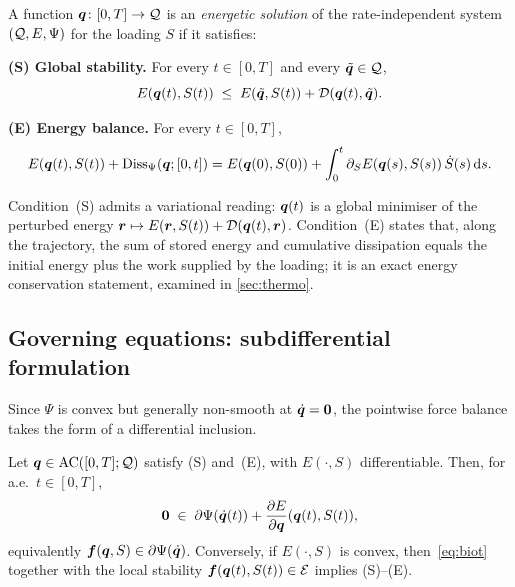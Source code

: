 \begin{definition}\label{def:energetic}
A function $\bm{q}\colon[0,T]\to\mathcal{Q}$ is an \emph{energetic solution} of the rate-independent system $(\mathcal{Q},E,\Psi)$ for the loading $S$ if it satisfies:

\smallskip
\noindent\textbf{(S) Global stability.} For every $t\in[0,T]$ and every
$\tilde{\bm{q}}\in\mathcal{Q}$,
\begin{equation}\label{eq:stability}
  E(\bm{q}(t),S(t)) \;\le\; E(\tilde{\bm{q}},S(t)) + \mathcal{D}(\bm{q}(t),\tilde{\bm{q}}).
\end{equation}

\noindent\textbf{(E) Energy balance.} For every $t\in[0,T]$,
\begin{equation}\label{eq:energy_balance}
  E(\bm{q}(t),S(t)) + \mathrm{Diss}_\Psi(\bm{q};[0,t])
  = E(\bm{q}(0),S(0)) + \int_0^t \partial_S E(\bm{q}(s),S(s))\,\dot S(s)\mathop{}\!\mathrm{d} s.
\end{equation}
\end{definition}

Condition~(S) admits a variational reading: $\bm{q}(t)$ is a global
minimiser of the perturbed energy $\bm{r}\mapsto E(\bm{r},S(t))+\mathcal{D}(\bm{q}(t),\bm{r})$. Condition~(E) states that, along the trajectory, the sum
of stored energy and cumulative dissipation equals the initial energy
plus the work supplied by the loading; it is an exact energy
conservation statement, examined in
\cref{sec:thermo}.

\subsection{Governing equations: subdifferential formulation}
\label{sec:subdiff}

Since $\Psi$ is convex but generally non-smooth at $\dot{\bm{q}}=\bm{0}$,
the pointwise force balance takes the form of a differential inclusion.

\begin{proposition}\label{prop:biot}
Let $\bm{q}\in\mathrm{AC}([0,T];\mathcal{Q})$ satisfy \textnormal{(S)}
and~\textnormal{(E)}, with $E(\cdot,S)$ differentiable. Then, for a.e.\
$t\in[0,T]$,
\begin{equation}\label{eq:biot}
  \bm{0} \;\in\; \partial\Psi(\dot{\bm{q}}(t)) + \frac{\partial E}{\partial\bm{q}}(\bm{q}(t),S(t)),
\end{equation}
equivalently $\bm{f}(\bm{q},S)\in\partial\Psi(\dot{\bm{q}})$. Conversely,
if $E(\cdot,S)$ is convex, then~\eqref{eq:biot} together with the
local stability $\bm{f}(\bm{q}(t),S(t))\in\mathcal{E}$ implies
\textnormal{(S)}--\textnormal{(E)}.
\end{proposition}


